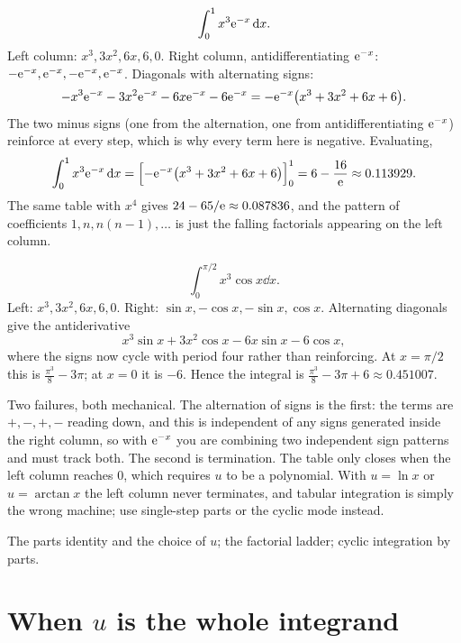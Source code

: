 \begin{worked}
\[\int_0^1x^{3}\mathrm{e}^{-x}\,\mathrm{d} x.\]
Left column: $x^{3},3x^{2},6x,6,0$. Right column, antidifferentiating $\mathrm{e}^{-x}$: $-\mathrm{e}^{-x},\mathrm{e}^{-x},-\mathrm{e}^{-x},\mathrm{e}^{-x}$. Diagonals with alternating signs:
\[-x^{3}\mathrm{e}^{-x}-3x^{2}\mathrm{e}^{-x}-6x\mathrm{e}^{-x}-6\mathrm{e}^{-x}=-\mathrm{e}^{-x}\bigl(x^{3}+3x^{2}+6x+6\bigr).\]
The two minus signs (one from the alternation, one from antidifferentiating $\mathrm{e}^{-x}$) reinforce at every step, which is why every term here is negative. Evaluating,
\[\int_0^1x^{3}\mathrm{e}^{-x}\,\mathrm{d} x=\Bigl[-\mathrm{e}^{-x}\bigl(x^{3}+3x^{2}+6x+6\bigr)\Bigr]_0^1=6-\frac{16}{\mathrm{e}}\approx0.113929.\]
The same table with $x^{4}$ gives $24-65/\mathrm{e}\approx0.087836$, and the pattern of coefficients $1,n,n(n-1),\ldots$ is just the falling factorials appearing on the left column.
\end{worked}

\begin{worked}
\[\int_0^{\pi/2}x^{3}\cos x\dd x.\]
Left: $x^{3},3x^{2},6x,6,0$. Right: $\sin x,-\cos x,-\sin x,\cos x$. Alternating diagonals give the antiderivative
\[x^{3}\sin x+3x^{2}\cos x-6x\sin x-6\cos x,\]
where the signs now cycle with period four rather than reinforcing. At $x=\pi/2$ this is $\tfrac{\pi^{3}}{8}-3\pi$; at $x=0$ it is $-6$. Hence the integral is $\tfrac{\pi^{3}}{8}-3\pi+6\approx0.451007$.
\end{worked}

\begin{trap}
Two failures, both mechanical. The alternation of signs is the first: the terms are $+,-,+,-$ reading down, and this is independent of any signs generated inside the right column, so with $\mathrm{e}^{-x}$ you are combining two independent sign patterns and must track both. The second is termination. The table only closes when the left column reaches $0$, which requires $u$ to be a polynomial. With $u=\ln x$ or $u=\arctan x$ the left column never terminates, and tabular integration is simply the wrong machine; use single-step parts or the cyclic mode instead.
\end{trap}

\begin{seealsob}The parts identity and the choice of $u$; the factorial ladder; cyclic integration by parts.\end{seealsob}

\section{When $u$ is the whole integrand}

